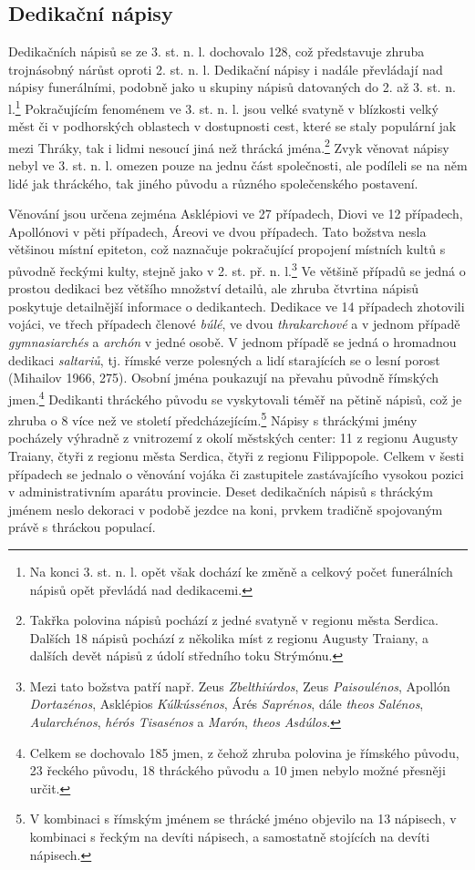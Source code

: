 \subsection[dedikační-nápisy-15]{Dedikační nápisy}

Dedikačních nápisů se ze 3. st. n. l. dochovalo 128, což představuje zhruba trojnásobný nárůst oproti 2. st. n. l. Dedikační nápisy i nadále převládají nad nápisy funerálními, podobně jako u skupiny nápisů datovaných do 2. až 3. st. n. l.\footnote{Na konci 3. st. n. l. opět však dochází ke změně a celkový počet funerálních nápisů opět převládá nad dedikacemi.} Pokračujícím fenoménem ve 3. st. n. l. jsou velké svatyně v blízkosti velký měst či v podhorských oblastech v dostupnosti cest, které se staly populární jak mezi Thráky, tak i lidmi nesoucí jiná než thrácká jména.\footnote{Takřka polovina nápisů pochází z jedné svatyně v regionu města Serdica. Dalších 18 nápisů pochází z několika míst z regionu Augusty Traiany, a dalších devět nápisů z údolí středního toku Strýmónu.} Zvyk věnovat nápisy nebyl ve 3. st. n. l. omezen pouze na jednu část společnosti, ale podíleli se na něm lidé jak thráckého, tak jiného původu a různého společenského postavení.

Věnování jsou určena zejména Asklépiovi ve 27 případech, Diovi ve 12 případech, Apollónovi v pěti případech, Áreovi ve dvou případech. Tato božstva nesla většinou místní epiteton, což naznačuje pokračující propojení místních kultů s původně řeckými kulty, stejně jako v 2. st. př. n. l.\footnote{Mezi tato božstva patří např. Zeus {\em Zbelthiúrdos}, Zeus {\em Paisoulénos}, Apollón {\em Dortazénos}, Asklépios {\em Kúlkússénos}, Árés {\em Saprénos}, dále {\em theos} {\em Salénos}, {\em Aularchénos}, {\em hérós} {\em Tisasénos} a {\em Marón}, {\em theos} {\em Asdúlos}.} Ve většině případů se jedná o prostou dedikaci bez většího množství detailů, ale zhruba čtvrtina nápisů poskytuje detailnější informace o dedikantech. Dedikace ve 14 případech zhotovili vojáci, ve třech případech členové {\em búlé}, ve dvou {\em thrakarchové} a v jednom případě {\em gymnasiarchés} a {\em archón} v jedné osobě. V jednom případě se jedná o hromadnou dedikaci {\em saltariů}, tj. římské verze polesných a lidí starajících se o lesní porost (Mihailov 1966, 275). Osobní jména poukazují na převahu původně římských jmen.\footnote{Celkem se dochovalo 185 jmen, z čehož zhruba polovina je římského původu, 23  řeckého původu, 18  thráckého původu a 10  jmen nebylo možné přesněji určit.} Dedikanti thráckého původu se vyskytovali téměř na pětině nápisů, což je zhruba o 8  více než ve století předcházejícím.\footnote{V kombinaci s římským jménem se thrácké jméno objevilo na 13 nápisech, v kombinaci s řeckým na devíti nápisech, a samostatně stojících na devíti nápisech.} Nápisy s thráckými jmény pocházely výhradně z vnitrozemí z okolí městských center: 11 z regionu Augusty Traiany, čtyři z regionu města Serdica, čtyři z regionu Filippopole. Celkem v šesti případech se jednalo o věnování vojáka či zastupitele zastávajícího vysokou pozici v administrativním aparátu provincie. Deset dedikačních nápisů s thráckým jménem neslo dekoraci v podobě jezdce na koni, prvkem tradičně spojovaným právě s thráckou populací.

